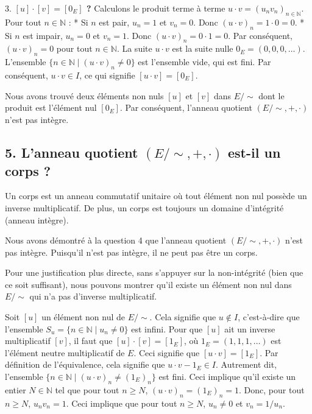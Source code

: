 \documentclass{report}
\begin{document}
3.  \textbf{$[u] \cdot [v] = [0_E]$ ?}
    Calculons le produit terme à terme $u \cdot v = (u_n v_n)_{n \in \mathbb{N}}$.
    Pour tout $n \in \mathbb{N}$ :
    *   Si $n$ est pair, $u_n = 1$ et $v_n = 0$. Donc $(u \cdot v)_n = 1 \cdot 0 = 0$.
    *   Si $n$ est impair, $u_n = 0$ et $v_n = 1$. Donc $(u \cdot v)_n = 0 \cdot 1 = 0$.
    Par conséquent, $(u \cdot v)_n = 0$ pour tout $n \in \mathbb{N}$.
    La suite $u \cdot v$ est la suite nulle $0_E = (0, 0, 0, \dots)$.
    L'ensemble $\{ n \in \mathbb{N} \mid (u \cdot v)_n \neq 0 \}$ est l'ensemble vide, qui est fini.
    Par conséquent, $u \cdot v \in I$, ce qui signifie $[u \cdot v] = [0_E]$.

Nous avons trouvé deux éléments non nuls $[u]$ et $[v]$ dans $E/\sim$ dont le produit est l'élément nul $[0_E]$.
Par conséquent, l'anneau quotient $(E/\sim, +, \cdot)$ n'est pas intègre.

\subsection*{5. L'anneau quotient $(E/\sim, +, \cdot)$ est-il un corps ?}

Un corps est un anneau commutatif unitaire où tout élément non nul possède un inverse multiplicatif. De plus, un corps est toujours un domaine d'intégrité (anneau intègre).

Nous avons démontré à la question 4 que l'anneau quotient $(E/\sim, +, \cdot)$ n'est pas intègre.
Puisqu'il n'est pas intègre, il ne peut pas être un corps.

Pour une justification plus directe, sans s'appuyer sur la non-intégrité (bien que ce soit suffisant), nous pouvons montrer qu'il existe un élément non nul dans $E/\sim$ qui n'a pas d'inverse multiplicatif.

Soit $[u]$ un élément non nul de $E/\sim$. Cela signifie que $u \notin I$, c'est-à-dire que l'ensemble $S_u = \{ n \in \mathbb{N} \mid u_n \neq 0 \}$ est infini.
Pour que $[u]$ ait un inverse multiplicatif $[v]$, il faut que $[u] \cdot [v] = [1_E]$, où $1_E = (1, 1, 1, \dots)$ est l'élément neutre multiplicatif de $E$.
Ceci signifie que $[u \cdot v] = [1_E]$.
Par définition de l'équivalence, cela signifie que $u \cdot v - 1_E \in I$.
Autrement dit, l'ensemble $\{ n \in \mathbb{N} \mid (u \cdot v)_n \neq (1_E)_n \}$ est fini.
Ceci implique qu'il existe un entier $N \in \mathbb{N}$ tel que pour tout $n \ge N$, $(u \cdot v)_n = (1_E)_n = 1$.
Donc, pour tout $n \ge N$, $u_n v_n = 1$.
Ceci implique que pour tout $n \ge N$, $u_n \neq 0$ et $v_n = 1/u_n$.
\end{document}
